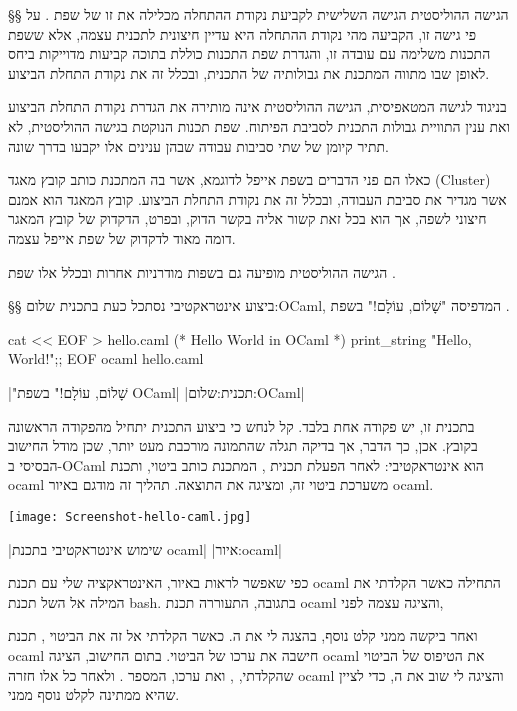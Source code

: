 §§ הגישה ההוליסטית
הגישה השלישית לקביעת נקודת ההתחלה מכלילה את זו של שפת . על פי גישה זו,
הקביעה מהי נקודת ההתחלה היא עדיין חיצונית לתכנית עצמה, אלא ששפת התכנות משלימה
עם עובדה זו, והגדרת שפת התכנות כוללת בתוכה קביעות מדוייקות ביחס לאופן שבו מתווה
המתכנת את גבולותיה של התכנית, ובכלל זה את נקודת התחלת הביצוע.

בניגוד לגישה המטאפיסית, הגישה ההוליסטית אינה מותירה את הגדרת נקודת התחלת הביצוע
ואת ענין התוויית גבולות התכנית לסביבת הפיתוח. שפת תכנות הנוקטת בגישה ההוליסטית,
לא תתיר קיומן של שתי סביבות עבודה שבהן ענינים אלו יקבעו בדרך שונה.

כאלו הם פני הדברים בשפת אייפל לדוגמא, אשר בה המתכנת כותב קובץ מאגד (Cluster)
אשר מגדיר את סביבת העבודה, ובכלל זה את נקודת התחלת הביצוע. קובץ המאגד הוא אמנם
חיצוני לשפה, אך הוא בכל זאת קשור אליה בקשר הדוק, ובפרט, הדקדוק של קובץ המאגר
דומה מאוד לדקדוק של שפת אייפל עצמה.

הגישה ההוליסטית מופיעה גם בשפות מודרניות אחרות ובכלל אלו שפת .

§§ ביצוע אינטראקטיבי
נסתכל כעת ב תכנית שלום:OCaml, המדפיסה "שָׁלוֹם, עוֹלָם!" בשפת .
\begin{תכנית}
\bash
cat << EOF > hello.caml
(* Hello World in OCaml *)
print_string "Hello, World!\n";;
EOF
ocaml hello.caml
\END

\setLTR
\lstset{language=[Objective]Caml,style=Numbered}

\setRTL
{}|"שָׁלוֹם, עוֹלָם!" בשפת OCaml|
|תכנית:שלום:OCaml|
\end{תכנית}
בתכנית זו, יש פקודה אחת בלבד.
קל לנחש כי ביצוע התכנית יתחיל מהפקודה הראשונה בקובץ.
אכן, כך הדבר, אך בדיקה תגלה שהתמונה מורכבת מעט יותר, שכן
מודל החישוב הבסיסי ב-OCaml הוא אינטראקטיבי:
לאחר הפעלת תכנית , המתכנת כותב ביטוי, ותכנת ocaml
משערכת ביטוי זה, ומציגה את התוצאה.
תהליך זה מודגם ב איור ocaml.

\begin{איור}[!htbp]
\begin{center}
\texttt{[image: Screenshot-hello-caml.jpg]}
\end{center}
|שימוש אינטראקטיבי בתכנת ocaml|
|איור:ocaml|
\end{איור}

כפי שאפשר לראות באיור, האינטראקציה שלי עם תכנת ocaml התחילה כאשר הקלדתי
את המילה  אל ה של תכנת bash.
בתגובה, התעוררה תכנת ocaml והציגה עצמה לפני,
\begin{קוד}
\end{קוד}
ואחר ביקשה ממני קלט נוסף, בהצגה לי את ה .
 כאשר הקלדתי אל  זה את הביטוי ,
 תכנת ocaml חישבה את ערכו של הביטוי.
 בתום החישוב, הציגה ocaml את הטיפוס של הביטוי שהקלדתי, ,
 ואת ערכו, המספר . ולאחר כל אלו חזרה ocaml והציגה לי שוב את ה, כדי לציין שהיא ממתינה
 לקלט נוסף ממני.

